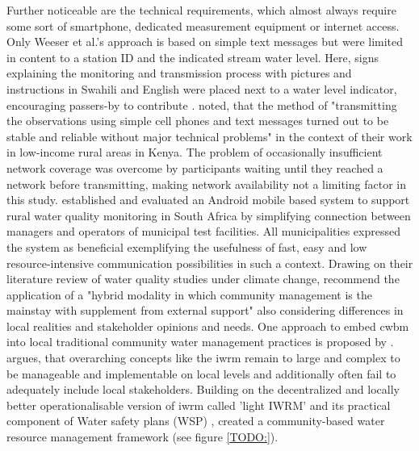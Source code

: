 Further noticeable are the technical requirements, which almost always require some sort of smartphone, dedicated measurement equipment or internet access. Only Weeser et al.'s approach is based on simple text messages but were limited in content to a station ID and the indicated stream water level. Here, signs explaining the monitoring and transmission process with pictures and instructions in Swahili and English were placed next to a water level indicator, encouraging passers-by to contribute \autocite{weeserCitizenSciencePioneers2018a}. \autocite[1597]{weeserCitizenSciencePioneers2018a} noted, that the method of "transmitting the observations using simple cell phones and text messages turned out to be stable and reliable without major technical problems" in the context of their work in low-income rural areas in Kenya. The problem of occasionally insufficient network coverage was overcome by participants waiting until they reached a network before transmitting, making network availability not a limiting factor in this study. \autocite{wilson-jonesUsingMobilePhones2012} established and evaluated an Android mobile based system to support rural water quality monitoring in South Africa by simplifying connection between managers and operators of municipal test facilities. All municipalities expressed the system as beneficial exemplifying the usefulness of fast, easy and low resource-intensive communication possibilities in such a context.\newline
Drawing on their literature review of water quality studies under climate change, \autocite[147]{huangManagementDrinkingWater2020} recommend the application of a "hybrid modality in which community management is the mainstay with supplement from external support" also considering differences in local realities and stakeholder opinions and needs. One approach to embed \acrshort{cwbm} into local traditional community water management practices is proposed by \autocite{dayCommunitybasedWaterResources2009}. \autocite{dayCommunitybasedWaterResources2009} argues, that overarching concepts like the \acrfull{iwrm} remain to large and complex to be manageable and implementable on local levels and additionally often fail to adequately include local stakeholders. Building on the decentralized and locally better operationalisable version of \acrshort{iwrm} called 'light IWRM' \autocite{butterworthFindingPracticalApproaches2010,moriartyIntegratedWaterResources2004} and its practical component of Water safety plans (WSP) \autocite{bartramWaterSafetyPlan2009}, \autocite{dayCommunitybasedWaterResources2009} created a community-based water resource management framework (see figure \ref{TODO:}). 

